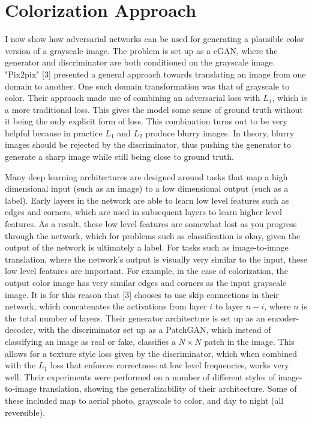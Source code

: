\documentclass[9pt]{article}
\begin{document}
\section{Colorization Approach}
I now show how adversarial networks can be used for generating a plausible color version of a grayscale image. The problem is set up as a cGAN, where the generator and discriminator
are both conditioned on the grayscale image. "Pix2pix" [3] presented a general approach towards translating an image from one domain to another. One such domain transformation was that of
grayscale to color. Their approach made use of combining an adversarial loss with $L_1$, which is a more traditional loss. This gives the model some sense of ground truth without it
being the only explicit form of loss. This combination turns out to be very helpful because in practice $L_1$ and $L_2$ produce blurry images. In theory, blurry
images should be rejected by the discriminator, thus pushing the generator to generate a sharp image while still being close to ground truth. \newline

\noindent Many deep learning architectures are designed around tasks that map a high dimensional input (such as an image) to a low dimensional output (such as a label). Early layers in
the network are able to learn low level features such as edges and corners, which are used in subsequent layers to learn higher level features. As a result, these low level features are
somewhat lost as you progress through the network, which for problems such as classification is okay, given the output of the network is ultimately a label. For tasks such as
image-to-image translation, where the network's output is visually very similar to the input, these low level features are important. For example, in the case of colorization, the
output color image has very similar edges and corners as the input grayscale image. It is for this reason that [3] chooses to use skip connections in their network, which concatenates the
activations from layer $i$ to layer $n-i$, where $n$ is the total number of layers. Their generator architecture is set up as an encoder-decoder, with the discriminator set up as a PatchGAN,
which instead of classifying an image as real or fake, classifies a $N \times N$ patch in the image. This allows for a texture style loss given by the discriminator, which when combined with
the $L_1$ loss that enforces correctness at low level frequencies, works very well. Their experiments were performed on a number of different styles of image-to-image translation, showing
the generalizability of their architecture. Some of these included map to aerial photo, grayscale to color, and day to night (all reversible). \newline
\end{document}
